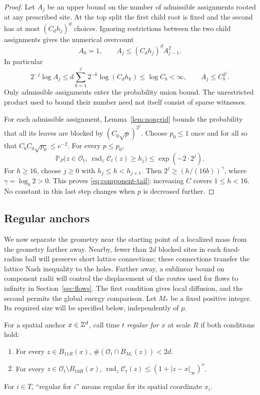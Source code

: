 \begin{proof}
Let \(A_j\) be an upper bound on the number of admissible assignments
rooted at any prescribed site.  At the top split the first child root
is fixed and the second has at most \((C_dh_j)^d\) choices.
Ignoring restrictions between the two child assignments gives the
numerical overcount
\[
 A_0=1,\qquad A_j\le(C_dh_j)^d A_{j-1}^2.
\]
In particular
\[
 2^{-j}\log A_j
 \le d\sum_{k=1}^j2^{-k}\log(C_dh_k)
 \le \log C_b<\infty,
 \qquad A_j\le C_b^{2^j}.
\]
Only admissible assignments enter the probability union bound.  The
unrestricted product used to bound their number need not itself
consist of sparse witnesses.

For each admissible assignment, Lemma~\ref{lem:nongrid} bounds the
probability that all its leaves are blocked by
\((C_0\sqrt p)^{2^j}\).  Choose \(p_0\le1\) once and for all so
that \(C_bC_0\sqrt{p_0}\le e^{-2}\).  For every \(p\le p_0\),
\begin{equation}\label{eq:discrete-component-tail}
 \mathbb P_P\bigl(z\in\mathcal O_t,\
      \operatorname{rad}_z\mathcal C_t(z)\ge h_j\bigr)
 \le \exp(-2\cdot2^j).
\end{equation}
For \(h\ge16\), choose \(j\ge0\) with
\(h_j\le h<h_{j+1}\).  Then
\(2^j\ge(h/(16b))^\gamma\), where \(\gamma=\log_b2>0\).
This proves \eqref{eq:component-tail}; increasing \(C\) covers
\(1\le h<16\).  No constant in this last step changes when \(p\)
is decreased further.
\end{proof}

\subsection{Regular anchors}

We now separate the geometry near the starting point of a localized
mass from the geometry farther away.  Nearby, fewer than $2d$ blocked
sites in each fixed-radius ball will preserve short lattice connections;
these connections transfer the lattice Nash inequality to the holes.
Farther away, a sublinear bound on component radii will control the
displacement of the routes used for flows to infinity in
Section~\ref{sec:flows}.  The first condition gives local diffusion,
and the second permits the global energy comparison.
Let \(M_*\) be a fixed positive integer.  Its required size will be
specified below, independently of \(p\).

\begin{definition}\label{def:regular-anchor}
For a spatial anchor \(x\in\mathbb Z^d\), call time \(t\)
\emph{regular for \(x\)} at scale \(R\) if both conditions hold:
\begin{enumerate}
 \item For every \(z\in B_{11R}(x)\),
       \(\#(\mathcal O_t\cap B_{M_*}(z))<2d\).
 \item For every \(z\in\mathcal O_t\setminus B_{10R}(x)\),
       \(\operatorname{rad}_z\mathcal C_t(z)
            \le(1+|z-x|_\infty)^\nu\).
\end{enumerate}
For \(i\in T\), ``regular for \(i\)'' means regular for its spatial
coordinate \(x_i\).
\end{definition}

